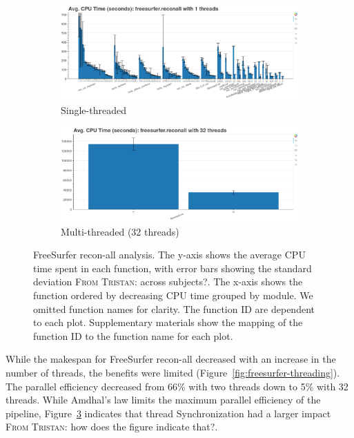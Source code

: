 \documentclass[conference]{IEEEtran}
\newcommand{\TG}[1]{\color{blue}\textsc{From Tristan: }#1\color{black}}
\begin{document}
\begin{figure}
	\centering
	\begin{subfigure}[t]{0.49\textwidth}
		\caption{Single-threaded}
		\label{subfig:hotspots-freesurfer-reconall-1thread}
		\includegraphics[width=\textwidth]{figures/hotspots-1threads-freesurfer-reconall-simple.png}
	\end{subfigure}
	\begin{subfigure}[t]{0.49\textwidth}
		\caption{Multi-threaded (32 threads)}
		\label{subfig:hotspots-freesurfer-reconall-32threads}
		\includegraphics[width=\textwidth]{figures/hotspots-32threads-freesurfer-reconall-simple.png}
	\end{subfigure}
	\caption{FreeSurfer recon-all analysis. The y-axis shows the average CPU time spent in each function, with error bars showing the standard deviation \TG{across subjects?}. The x-axis shows the function ordered by decreasing CPU time grouped by module. We omitted function names for clarity. The function ID are dependent to each plot. Supplementary materials show the mapping of the function ID to the function name for each plot.}
	\label{fig:hotspots-freesurfer-reconall}
\end{figure}
			
While the makespan for FreeSurfer recon-all decreased with an increase in the number of threads, the benefits were limited (Figure~\ref{fig:freesurfer-threading}). The parallel efficiency decreased from 66\% with two threads down to 5\% with 32 threads. While Amdhal's law limits the maximum parallel efficiency of the pipeline, Figure~\ref{fig:hotspots-freesurfer-reconall} indicates that thread Synchronization had a larger impact \TG{how does the figure indicate that?}.
					
\end{document}
